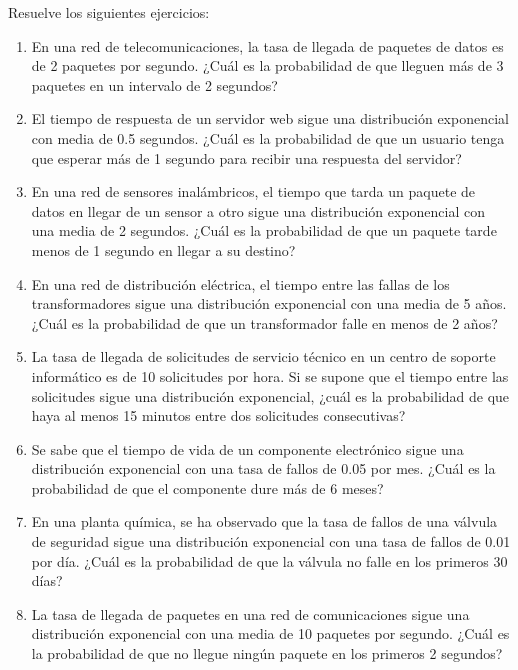 \begin{Ejer}
Resuelve los siguientes ejercicios:
\begin{enumerate}

    \item En una red de telecomunicaciones, la tasa de llegada de paquetes de datos es de 2 paquetes por segundo. ¿Cuál es la probabilidad de que lleguen más de 3 paquetes en un intervalo de 2 segundos?

    \item El tiempo de respuesta de un servidor web sigue una distribución exponencial con media de 0.5 segundos. ¿Cuál es la probabilidad de que un usuario tenga que esperar más de 1 segundo para recibir una respuesta del servidor?

    \item En una red de sensores inalámbricos, el tiempo que tarda un paquete de datos en llegar de un sensor a otro sigue una distribución exponencial con una media de 2 segundos. ¿Cuál es la probabilidad de que un paquete tarde menos de 1 segundo en llegar a su destino?

    \item En una red de distribución eléctrica, el tiempo entre las fallas de los transformadores sigue una distribución exponencial con una media de 5 años. ¿Cuál es la probabilidad de que un transformador falle en menos de 2 años?

    \item La tasa de llegada de solicitudes de servicio técnico en un centro de soporte informático es de 10 solicitudes por hora. Si se supone que el tiempo entre las solicitudes sigue una distribución exponencial, ¿cuál es la probabilidad de que haya al menos 15 minutos entre dos solicitudes consecutivas?

    \item Se sabe que el tiempo de vida de un componente electrónico sigue una distribución exponencial con una tasa de fallos de 0.05 por mes. ¿Cuál es la probabilidad de que el componente dure más de 6 meses?

    \item En una planta química, se ha observado que la tasa de fallos de una válvula de seguridad sigue una distribución exponencial con una tasa de fallos de 0.01 por día. ¿Cuál es la probabilidad de que la válvula no falle en los primeros 30 días?

    \item La tasa de llegada de paquetes en una red de comunicaciones sigue una distribución exponencial con una media de 10 paquetes por segundo. ¿Cuál es la probabilidad de que no llegue ningún paquete en los primeros 2 segundos?


\end{enumerate}
\end{Ejer}
